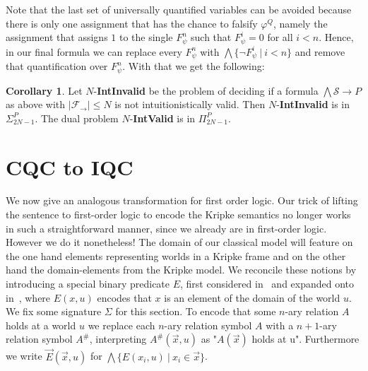 \documentclass[a4paper,12pt]{report}
\theoremstyle{definition}
\theoremstyle{definition}
\newtheorem{corollary}[theorem]{Corollary}
\theoremstyle{definition}
\theoremstyle{definition}
\theoremstyle{definition}
\theoremstyle{definition}
\theoremstyle{definition}
\begin{document}
	Note that the last set of universally quantified variables can be avoided because there is only one assignment that has the chance to falsify $\varphi^Q$, namely the assignment that assigns $1$ to the single $F_\psi^n$ such that $F_\psi^i = 0$ for all $i < n$. Hence, in our final formula we can replace every $F_\psi^n$ with $\bigwedge\{\neg F_\psi^i\:|\:i < n\}$ and remove that quantification over $F_\psi^n$. With that we get the following:
	
	\begin{corollary}
		Let $N$-\textbf{IntInvalid} be the problem of deciding if a formula $\bigwedge \mathcal S\to P$ as above with $|\mathcal F_\to|\leq N$ is not intuitionistically valid. Then $N$-\textbf{IntInvalid} is in $\Sigma_{2N-1}^P$. The dual problem $N$-\textbf{IntValid} is in $\Pi_{2N-1}^P$.
	\end{corollary}
	
	\section{CQC to IQC}
	
	We now give an analogous transformation for first order logic. Our trick of lifting the sentence to first-order logic to encode the Kripke semantics no longer works in such a straightforward manner, since we already are in first-order logic. However we do it nonetheless! The domain of our classical model will feature on the one hand elements representing worlds in a Kripke frame and on the other hand the domain-elements from the Kripke model. We reconcile these notions by introducing a special binary predicate $E$, first considered in~\cite{baaz2006skolemization} and expanded onto in~\cite{iemhoff2010eskolemization}, where $E(x, u)$ encodes that $x$ is an element of the domain of the world $u$. We fix some signature $\Sigma$ for this section. To encode that some $n$-ary relation $A$ holds at a world $u$ we replace each $n$-ary relation symbol $A$ with a $n+1$-ary relation symbol $A^\#$, interpreting $A^\#(\vec x, u)$ as "$A(\vec x)$ holds at u". Furthermore we write $\vec E(\vec x, u)$ for $\bigwedge\{E(x_i, u)\:|\:x_i\in \vec x\}$.
	
\end{document}
